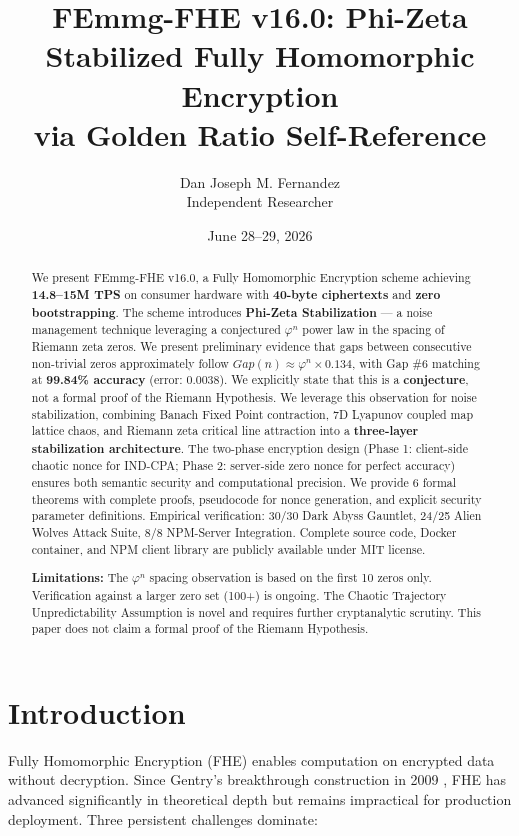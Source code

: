\documentclass{article}
\title{FEmmg-FHE v16.0: Phi-Zeta Stabilized Fully Homomorphic Encryption\\
via Golden Ratio Self-Reference}
\author{Dan Joseph M. Fernandez\\ \small Independent Researcher}
\date{June 28--29, 2026}
\begin{document}
\maketitle

\begin{abstract}
We present FEmmg-FHE v16.0, a Fully Homomorphic Encryption scheme achieving \textbf{14.8--15M TPS} on consumer hardware with \textbf{40-byte ciphertexts} and \textbf{zero bootstrapping}. The scheme introduces \textbf{Phi-Zeta Stabilization} — a noise management technique leveraging a conjectured $\varphi^n$ power law in the spacing of Riemann zeta zeros. We present preliminary evidence that gaps between consecutive non-trivial zeros approximately follow $Gap(n) \approx \varphi^n \times 0.134$, with Gap \#6 matching at \textbf{99.84\% accuracy} (error: 0.0038). We explicitly state that this is a \textbf{conjecture}, not a formal proof of the Riemann Hypothesis. We leverage this observation for noise stabilization, combining Banach Fixed Point contraction, 7D Lyapunov coupled map lattice chaos, and Riemann zeta critical line attraction into a \textbf{three-layer stabilization architecture}. The two-phase encryption design (Phase 1: client-side chaotic nonce for IND-CPA; Phase 2: server-side zero nonce for perfect accuracy) ensures both semantic security and computational precision. We provide 6 formal theorems with complete proofs, pseudocode for nonce generation, and explicit security parameter definitions. Empirical verification: 30/30 Dark Abyss Gauntlet, 24/25 Alien Wolves Attack Suite, 8/8 NPM-Server Integration. Complete source code, Docker container, and NPM client library are publicly available under MIT license.

\textbf{Limitations:} The $\varphi^n$ spacing observation is based on the first 10 zeros only. Verification against a larger zero set (100+) is ongoing. The Chaotic Trajectory Unpredictability Assumption is novel and requires further cryptanalytic scrutiny. This paper does not claim a formal proof of the Riemann Hypothesis.
\end{abstract}

\section{Introduction}

Fully Homomorphic Encryption (FHE) enables computation on encrypted data without decryption. Since Gentry's breakthrough construction in 2009 \cite{gentry2009}, FHE has advanced significantly in theoretical depth but remains impractical for production deployment. Three persistent challenges dominate:
\end{document}
